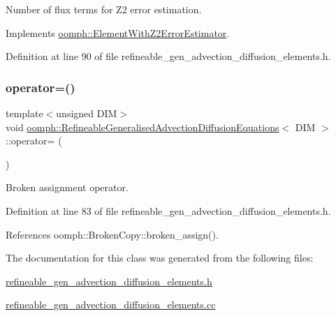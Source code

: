 Number of \textquotesingle{}flux\textquotesingle{} terms for Z2 error estimation. 



Implements \hyperlink{classoomph_1_1ElementWithZ2ErrorEstimator_ae82c5728902e13da31be19c390fc28e3}{oomph\+::\+Element\+With\+Z2\+Error\+Estimator}.



Definition at line 90 of file refineable\+\_\+gen\+\_\+advection\+\_\+diffusion\+\_\+elements.\+h.

\mbox{\label{classoomph_1_1RefineableGeneralisedAdvectionDiffusionEquations_a37d21f46a5f0b726349b42bb0d47b35e}} 
\subsubsection{\texorpdfstring{operator=()}{operator=()}}
{\footnotesize\ttfamily template$<$unsigned D\+IM$>$ \\
void \hyperlink{classoomph_1_1RefineableGeneralisedAdvectionDiffusionEquations}{oomph\+::\+Refineable\+Generalised\+Advection\+Diffusion\+Equations}$<$ D\+IM $>$\+::operator= (\begin{DoxyParamCaption}\item[{const \hyperlink{classoomph_1_1RefineableGeneralisedAdvectionDiffusionEquations}{Refineable\+Generalised\+Advection\+Diffusion\+Equations}$<$ D\+IM $>$ \&}]{ }\end{DoxyParamCaption})\hspace{0.3cm}{\ttfamily [inline]}}



Broken assignment operator. 



Definition at line 83 of file refineable\+\_\+gen\+\_\+advection\+\_\+diffusion\+\_\+elements.\+h.



References oomph\+::\+Broken\+Copy\+::broken\+\_\+assign().



The documentation for this class was generated from the following files\+:\begin{DoxyCompactItemize}
\item 
\hyperlink{refineable__gen__advection__diffusion__elements_8h}{refineable\+\_\+gen\+\_\+advection\+\_\+diffusion\+\_\+elements.\+h}\item 
\hyperlink{refineable__gen__advection__diffusion__elements_8cc}{refineable\+\_\+gen\+\_\+advection\+\_\+diffusion\+\_\+elements.\+cc}\end{DoxyCompactItemize}
